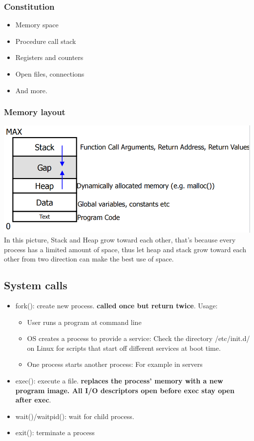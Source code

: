 \documentclass[12pt]{article}
\begin{document}
\subsubsection{Constitution}
\begin{itemize}
    \item Memory space
    \item Procedure call stack
    \item Registers and counters
    \item Open files, connections
    \item And more.
\end{itemize}

\subsubsection{Memory layout}
\includegraphics[width=1.0\textwidth]{ProcessMemoryLayout.png}
In this picture, Stack and Heap grow toward each other, that's because every process has a limited amount of space, thus let heap and stack grow toward each other from two direction can make the best use of space.

\subsection{System calls}
\begin{itemize}
    \item fork(): create new process. {\bfseries called once but return twice}. Usage: \begin{itemize}
        \item User runs a program at command line
        \item OS creates a process to provide a service: Check the directory /etc/init.d/ on Linux for scripts that start off different services at boot time.
        \item One process starts another process: For example in servers
    \end{itemize}
    \item exec(): execute a file. {\bfseries replaces the process’ memory with a new program image. All I/O descriptors open before exec stay open after exec}.
    \item wait()/waitpid(): wait for child process.
    \item exit(): terminate a process
\end{itemize}
\end{document}
